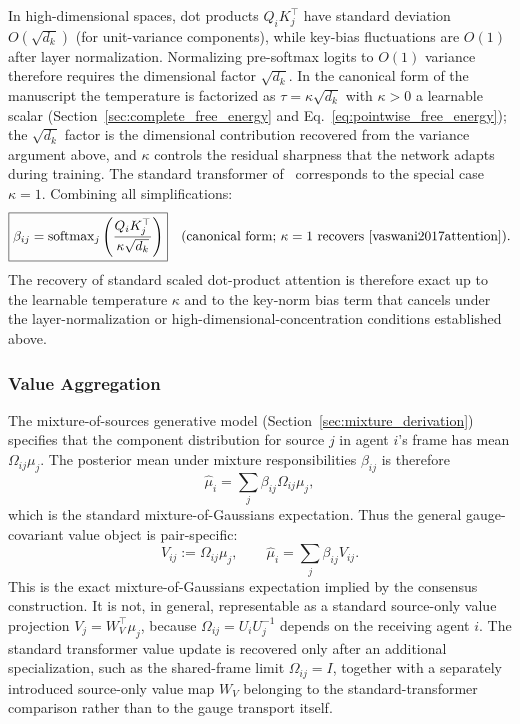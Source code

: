 \documentclass[11pt]{article}
\begin{document}
In high-dimensional spaces, dot products $Q_iK_j^\top$ have standard deviation $O(\sqrt{d_k})$ (for unit-variance components), while key-bias fluctuations are $O(1)$ after layer normalization. Normalizing pre-softmax logits to $O(1)$ variance therefore requires the dimensional factor $\sqrt{d_k}$. In the canonical form of the manuscript the temperature is factorized as $\tau = \kappa\sqrt{d_k}$ with $\kappa > 0$ a learnable scalar (Section~\ref{sec:complete_free_energy} and Eq.~\eqref{eq:pointwise_free_energy}); the $\sqrt{d_k}$ factor is the dimensional contribution recovered from the variance argument above, and $\kappa$ controls the residual sharpness that the network adapts during training. The standard transformer of~\cite{vaswani2017attention} corresponds to the special case $\kappa = 1$. Combining all simplifications:
\begin{equation}
\boxed{\beta_{ij} = \mathrm{softmax}_j\left(\frac{Q_i K_j^\top}{\kappa\sqrt{d_k}}\right)}\quad\text{(canonical form; }\kappa=1\text{ recovers~\cite{vaswani2017attention}).}
\end{equation}
The recovery of standard scaled dot-product attention is therefore exact up to the learnable temperature $\kappa$ and to the key-norm bias term that cancels under the layer-normalization or high-dimensional-concentration conditions established above.

\subsubsection{Value Aggregation}\label{sec:value_aggregation_itfb}

The mixture-of-sources generative model (Section~\ref{sec:mixture_derivation}) specifies that the component distribution for source $j$ in agent $i$'s frame has mean $\Omega_{ij}\mu_j$. The posterior mean under mixture responsibilities $\beta_{ij}$ is therefore
\begin{equation}
\hat\mu_i = \sum_j \beta_{ij} \Omega_{ij}\mu_j,
\label{eq:glk_mixture_aggregation_itfb}
\end{equation}
which is the standard mixture-of-Gaussians expectation. Thus the general gauge-covariant value object is pair-specific:
\begin{equation}
V_{ij} := \Omega_{ij}\mu_j,
\qquad
\hat\mu_i = \sum_j \beta_{ij}V_{ij}.
\end{equation}
This is the exact mixture-of-Gaussians expectation implied by the consensus construction. It is not, in general, representable as a standard source-only value projection $V_j=W_V^\top\mu_j$, because $\Omega_{ij}=U_iU_j^{-1}$ depends on the receiving agent $i$. The standard transformer value update is recovered only after an additional specialization, such as the shared-frame limit $\Omega_{ij}=I$, together with a separately introduced source-only value map $W_V$ belonging to the standard-transformer comparison rather than to the gauge transport itself.
\end{document}
